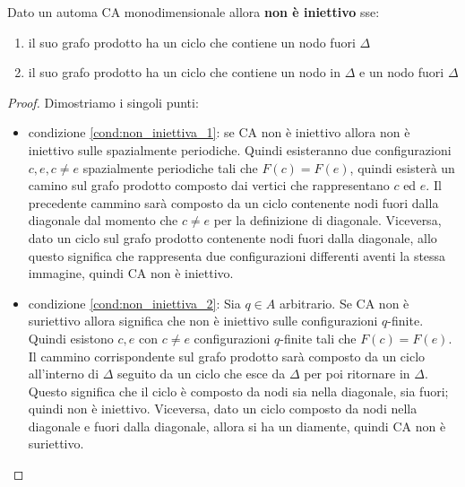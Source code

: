 \begin{teorema}
    Dato un automa CA monodimensionale allora \textbf{non è iniettivo} sse:
    \begin{enumerate}
        \item \label{cond:non_iniettiva_1} il suo grafo prodotto ha un ciclo che contiene un nodo fuori $\Delta$
        \item \label{cond:non_iniettiva_2}il suo grafo prodotto ha un ciclo che contiene un nodo in $\Delta$ e
              un nodo fuori $\Delta$
    \end{enumerate}
    \begin{proof}
        Dimostriamo i singoli punti:
        \begin{itemize}
            \item condizione \ref{cond:non_iniettiva_1}: se CA non è iniettivo
                  allora non è iniettivo sulle spazialmente periodiche. Quindi esisteranno
                  due configurazioni $c,e, c\ne e$ spazialmente periodiche tali che $F(c) = F(e)$,
                  quindi esisterà un camino sul grafo prodotto composto dai vertici che
                  rappresentano $c$ ed $e$. Il precedente cammino sarà composto da un ciclo
                  contenente nodi fuori dalla diagonale dal momento che $c\ne e$ per la
                  definizione di diagonale. Viceversa, dato un ciclo sul grafo prodotto contenente nodi
                  fuori dalla diagonale, allo questo significa che rappresenta due
                  configurazioni differenti aventi la stessa immagine, quindi CA non è
                  iniettivo.
            \item condizione \ref{cond:non_iniettiva_2}: Sia $q\in A$ arbitrario.
                  Se CA non è suriettivo allora significa che non è iniettivo sulle
                  configurazioni $q$-finite. Quindi esistono $c,e$ con $c\ne e $ configurazioni
                  $q$-finite tali che $F(c) =F(e)$. Il cammino corrispondente sul
                  grafo prodotto sarà composto da un ciclo all'interno di $\Delta$
                  seguito da un ciclo che esce da $\Delta$ per poi ritornare in $\Delta$.
                  Questo significa che il ciclo è composto da nodi sia nella diagonale,
                  sia fuori; quindi non è iniettivo. Viceversa, dato un ciclo composto da nodi nella diagonale
                  e fuori dalla diagonale, allora si ha un diamente, quindi CA non è suriettivo.

        \end{itemize}
    \end{proof}
\end{teorema}

